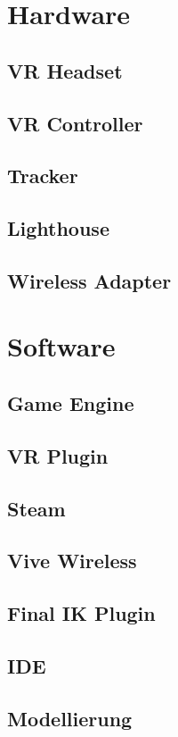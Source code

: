 \section{Hardware}
\lipsum[5-12]

\subsection{VR Headset}
\lipsum[5-12]

\subsection{VR Controller}
\lipsum[5-12]

\subsection{Tracker}
\lipsum[5-12]

\subsection{Lighthouse}
\lipsum[5-12]

\subsection{Wireless Adapter }
\lipsum[5-12]

\section{Software}

\subsection{Game Engine}
\lipsum[5-12]

\subsection{VR Plugin}
\lipsum[5-12]

\subsection{Steam}
\lipsum[5-12]

\subsection{Vive Wireless}
\lipsum[5-12]

\subsection{Final IK Plugin}
\lipsum[5-12]

\subsection{IDE}
\lipsum[5-12]

\subsection{Modellierung}
\lipsum[5-12]
